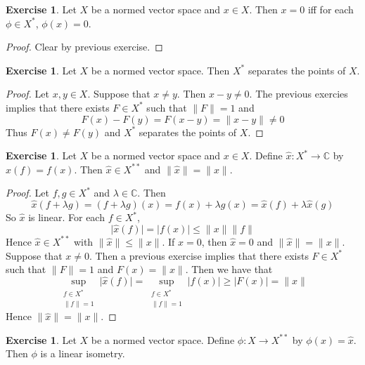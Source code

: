 \documentclass[12pt]{amsart}
\theoremstyle{definition}
\newtheorem{ex}[definition]{Exercise}
\newcommand{\lam}{\lambda}
\newcommand{\C}{\mathbb{C}}
\newcommand{\lex}[1]{\label{ex:#1}}
\begin{document}
	\begin{ex}
	Let $X$ be a normed vector space and $x \in X$. Then $x = 0$ iff for each $\phi \in X^*$, $\phi(x) = 0$.
	\end{ex}
	
	\begin{proof}
	Clear by previous exercise.
\end{proof}		
		
	\begin{ex} \lex{}
		Let $X$ be a normed vector space. Then $X^*$ separates the points of $X$. 
	\end{ex}
	
	\begin{proof}
		Let $x, y \in X$. Suppose that $x \neq y$. Then $x-y \neq 0$. The previous exercies implies that there exists $F \in X^*$ such that $\|F \|= 1$ and $$F(x) - F(y) = F(x-y) = \|x-y \|\neq 0$$ Thus $F(x) \neq F(y)$ and $X^*$ separates the points of $X$.
	\end{proof}
	
	
	\begin{ex} \lex{}
		Let $X$ be a normed vector space and $x \in X$. Define $\hat{x}:X^* \rightarrow \C$ by $\hat{x}(f) = f(x)$. Then $\hat{x} \in X^{**}$ and $\|\hat{x} \|= \|x \|$.
	\end{ex}
	
	\begin{proof}
		Let $f,g \in X^*$ and $\lam \in \C$. Then $$\hat{x}(f+\lam g) = (f+ \lam g)(x) = f(x) + \lam g(x) = \hat{x}(f) + \lam \hat{x}(g)$$
		So $\hat{x}$ is linear. For each $f \in X^*$, $$\vert \hat{x}(f) \vert = \vert f(x) \vert \leq \|x \|\|f \|$$ Hence $\hat{x} \in X^{**}$ with $\|\hat{x} \|\leq \|x \|$. If $x=0$, then $\hat{x} = 0$ and $\|\hat{x} \|= \|x \|$. Suppose that $x \neq 0$. Then a previous exercise implies that there exists $F \in X^*$ such that $\|F \|=1$ and $F(x) = \|x \|$. Then we have that $$\sup_{\substack{f \in X^* \\ \|f \|= 1 } } \vert \hat{x}(f) \vert  = \sup_{\substack{f \in X^* \\ \|f \|= 1 }}  \vert f(x) \vert \geq \vert F(x) \vert = \|x \|$$
		Hence $\|\hat{x} \|= \|x \|$.
	\end{proof}
	
	
	\begin{ex} \lex{}
		Let $X$ be a normed vector space. Define $\phi : X \rightarrow X^{**}$ by $\phi(x) = \hat{x}$. Then $\phi$ is a linear isometry. 
	\end{ex}
	
\end{document}
